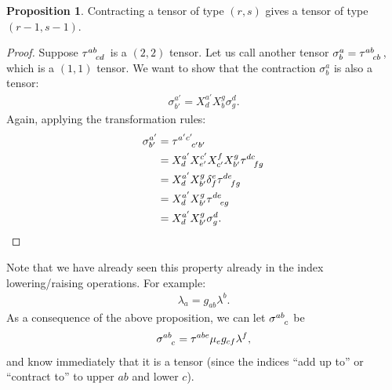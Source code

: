 \documentclass{article}
\theoremstyle{definition}
\newtheorem{prop}{Proposition}[section]
\begin{document}
\begin{prop}
	Contracting a tensor of type $(r,s)$ gives a tensor of type $(r-1,s-1)$.
\end{prop}
\begin{proof}
	Suppose $\tensor{\tau}{^{ab}_{cd}}$ is a $(2,2)$ tensor. Let us call another tensor $\sigma^{a}_b = \tensor{\tau}{^{ab}_{cb}}$, which is a $(1,1)$ tensor. We want to show that the contraction $\sigma^{a}_{b}$ is also a tensor:
	\begin{align*}
	\sigma^{a'}_{b'} = X^{a'}_{d}X^{g}_{b}\sigma^{d}_g.
	\end{align*}
	Again, applying the transformation rules:
	\begin{align*}
	\sigma^{a'}_{b'} &= \tensor{\tau}{^{a'c'}_{c'b'}}\\
	&= X^{a'}_{d}X^{c'}_{e'}X^{f}_{c'}X^{g}_{b'}\tensor{\tau}{^{dc}_{fg}}\\
	&= X^{a'}_{d}X^{g}_{b'}\delta^{e}_f\tensor{\tau}{^{de}_{fg}}\\
	&= X^{a'}_{d}X^{g}_{b'}\tensor{\tau}{^{de}_{eg}}\\
	&= X^{a'}_{d}X^{g}_{b'}\sigma^{d}_g.
	\end{align*}
\end{proof}
Note that we have already seen this property already in the index lowering/raising operations. For example:
\begin{align*}
\lambda_a = g_{ab}\lambda^b.
\end{align*}
As a consequence of the above proposition, we can let $\tensor{\sigma}{^{ab}_{c}}$ be
\begin{align*}
\tensor{\sigma}{^{ab}_{c}} = \tensor{\tau}{^{abe}}\mu_eg_{cf}\lambda^f,
\end{align*}
and know immediately that it is a tensor (since the indices ``add up to'' or ``contract to'' to upper $ab$ and lower $c$).
\end{document}
